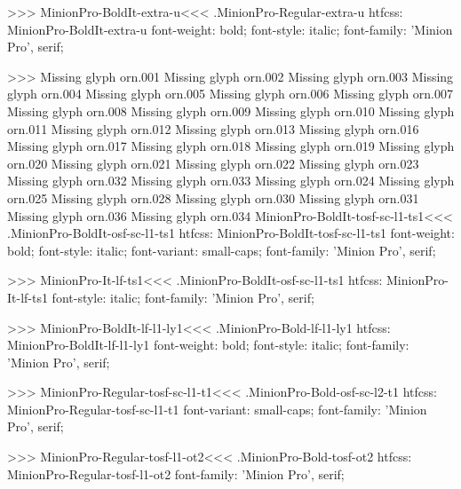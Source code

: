 {>>>
\<MinionPro-BoldIt-extra-u\><<<
.MinionPro-Regular-extra-u
htfcss:  MinionPro-BoldIt-extra-u  font-weight: bold; font-style: italic; font-family: 'Minion Pro', serif;

>>>
Missing glyph	orn.001
Missing glyph	orn.002
Missing glyph	orn.003
Missing glyph	orn.004
Missing glyph	orn.005
Missing glyph	orn.006
Missing glyph	orn.007
Missing glyph	orn.008
Missing glyph	orn.009
Missing glyph	orn.010
Missing glyph	orn.011
Missing glyph	orn.012
Missing glyph	orn.013
Missing glyph	orn.016
Missing glyph	orn.017
Missing glyph	orn.018
Missing glyph	orn.019
Missing glyph	orn.020
Missing glyph	orn.021
Missing glyph	orn.022
Missing glyph	orn.023
Missing glyph	orn.032
Missing glyph	orn.033
Missing glyph	orn.024
Missing glyph	orn.025
Missing glyph	orn.028
Missing glyph	orn.030
Missing glyph	orn.031
Missing glyph	orn.036
Missing glyph	orn.034
\<MinionPro-BoldIt-tosf-sc-l1-ts1\><<<
.MinionPro-BoldIt-osf-sc-l1-ts1
htfcss:  MinionPro-BoldIt-tosf-sc-l1-ts1  font-weight: bold; font-style: italic; font-variant: small-caps; font-family: 'Minion Pro', serif;

>>>
\<MinionPro-It-lf-ts1\><<<
.MinionPro-BoldIt-osf-sc-l1-ts1
htfcss:  MinionPro-It-lf-ts1  font-style: italic; font-family: 'Minion Pro', serif;

>>>
\<MinionPro-BoldIt-lf-l1-ly1\><<<
.MinionPro-Bold-lf-l1-ly1
htfcss:  MinionPro-BoldIt-lf-l1-ly1  font-weight: bold; font-style: italic; font-family: 'Minion Pro', serif;

>>>
\<MinionPro-Regular-tosf-sc-l1-t1\><<<
.MinionPro-Bold-osf-sc-l2-t1
htfcss:  MinionPro-Regular-tosf-sc-l1-t1  font-variant: small-caps; font-family: 'Minion Pro', serif;

>>>
\<MinionPro-Regular-tosf-l1-ot2\><<<
.MinionPro-Bold-tosf-ot2
htfcss:  MinionPro-Regular-tosf-l1-ot2  font-family: 'Minion Pro', serif;

}
